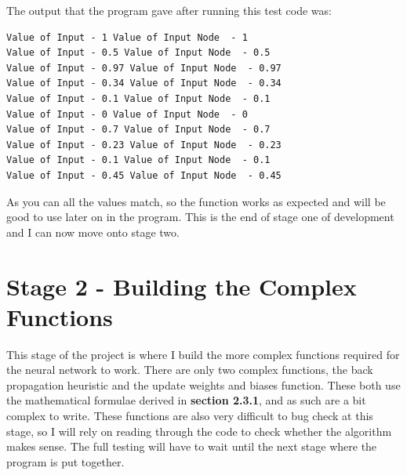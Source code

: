 \documentclass{report}
\begin{document}
The output that the program gave after running this test code was:
\begin{verbatim}
Value of Input - 1 Value of Input Node  - 1
Value of Input - 0.5 Value of Input Node  - 0.5
Value of Input - 0.97 Value of Input Node  - 0.97
Value of Input - 0.34 Value of Input Node  - 0.34
Value of Input - 0.1 Value of Input Node  - 0.1
Value of Input - 0 Value of Input Node  - 0
Value of Input - 0.7 Value of Input Node  - 0.7
Value of Input - 0.23 Value of Input Node  - 0.23
Value of Input - 0.1 Value of Input Node  - 0.1
Value of Input - 0.45 Value of Input Node  - 0.45
\end{verbatim}
As you can all the values match, so the function works as expected and will be good to use later on in the program. This is the end of stage one of development and I can now move onto stage two.
\newpage
\section{Stage 2 - Building the Complex Functions}
This stage of the project is where I build the more complex functions required for the neural network to work. There are only two complex functions, the back propagation heuristic and the update weights and biases function. These both use the mathematical formulae derived in \textbf{section 2.3.1}, and as such are a bit complex to write. These functions are also very difficult to bug check at this stage, so I will rely on reading through the code to check whether the algorithm makes sense. The full testing will have to wait until the next stage where the program is put together.
\end{document}
